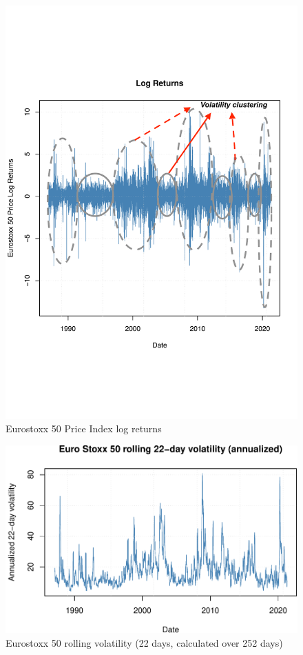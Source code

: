 \documentclass[a4paper, twoside]{templates/ociamthesis}
\begin{document}
\begin{figure}[h]

{\centering \includegraphics[width=0.75\linewidth]{figures/vol-clustering-final-withcircles} 

}

\caption{Eurostoxx 50 Price Index log returns}\label{fig:plot2}
\end{figure}

\begin{figure}[h]

{\centering \includegraphics[width=0.75\linewidth]{_main_files/figure-latex/plot3-1} 

}

\caption{Eurostoxx 50 rolling volatility (22 days, calculated over 252 days)}\label{fig:plot3}
\end{figure}
\end{document}
